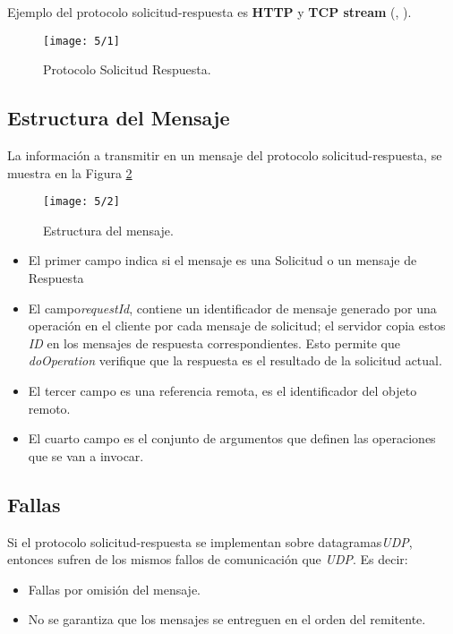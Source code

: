 Ejemplo del protocolo solicitud-respuesta es \textbf{HTTP}  y \textbf{TCP stream} (\cite{Vitillo2021}, \cite{Coulouris2011}).


\begin{figure}   
	 \begin{center}%
	\texttt{[image: 5/1]}   %
	\caption{Protocolo Solicitud Respuesta.}
	\label{fig:sol-resp}
\end{center} 
 \end{figure}

\subsection{Estructura del Mensaje}  

La información a transmitir en un mensaje del protocolo solicitud-respuesta,  se muestra en la Figura \ref{fig:est-men}


\begin{figure}    
		\begin{center}%
	\texttt{[image: 5/2]}     %
	\caption{Estructura del mensaje.}
	\label{fig:est-men}
\end{center} 
 \end{figure} 

\begin{itemize}
	\item El primer campo indica si el mensaje es una Solicitud o un mensaje de Respuesta
	\item El campo\textit{requestId}, contiene un identificador de mensaje generado por una  operación en el cliente por cada mensaje de solicitud;  el servidor copia estos \textit{ID} en los mensajes de respuesta correspondientes. Esto permite que \textit{doOperation} verifique que la respuesta es el resultado de la solicitud actual. 
	\item El tercer campo es una referencia remota, es el identificador del objeto remoto.
	\item El cuarto campo es el conjunto de argumentos que definen las operaciones que se van  a invocar.
\end{itemize}


\subsection{Fallas}  

Si el protocolo solicitud-respuesta se implementan sobre datagramas\textit{UDP},  entonces sufren de los mismos fallos de comunicación que \textit{UDP}. Es decir:
\begin{itemize}
	\item Fallas por omisión del mensaje. 
	\item No se garantiza que los mensajes se entreguen en el orden del remitente.
\end{itemize}


